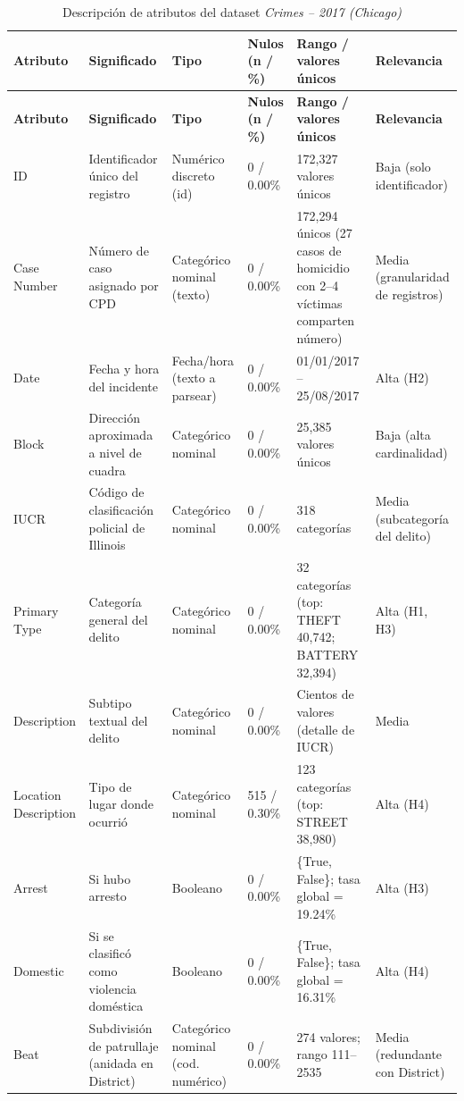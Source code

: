 \documentclass[11pt,a4paper]{article}
\begin{document}
\begin{landscape}
\begin{longtable}{P{2.6cm} P{4.0cm} P{1.6cm} P{2.0cm} P{4.4cm} P{3.4cm}}
\caption{Descripción de atributos del dataset \textit{Crimes -- 2017 (Chicago)}}
\label{tab:atributos}\\
\toprule
\textbf{Atributo} & \textbf{Significado} & \textbf{Tipo} & \textbf{Nulos (n / \%)} & \textbf{Rango / valores únicos} & \textbf{Relevancia}\\
\midrule
\endfirsthead
\toprule
\textbf{Atributo} & \textbf{Significado} & \textbf{Tipo} & \textbf{Nulos (n / \%)} & \textbf{Rango / valores únicos} & \textbf{Relevancia}\\
\midrule
\endhead
\bottomrule
\endfoot
ID & Identificador único del registro & Numérico discreto (id) & 0 / 0.00\% & 172,327 valores únicos & Baja (solo identificador) \\
Case Number & Número de caso asignado por CPD & Categórico nominal (texto) & 0 / 0.00\% & 172,294 únicos (27 casos de homicidio con 2--4 víctimas comparten número) & Media (granularidad de registros) \\
Date & Fecha y hora del incidente & Fecha/hora (texto a parsear) & 0 / 0.00\% & 01/01/2017 -- 25/08/2017 & Alta (H2) \\
Block & Dirección aproximada a nivel de cuadra & Categórico nominal & 0 / 0.00\% & 25,385 valores únicos & Baja (alta cardinalidad) \\
IUCR & Código de clasificación policial de Illinois & Categórico nominal & 0 / 0.00\% & 318 categorías & Media (subcategoría del delito) \\
Primary Type & Categoría general del delito & Categórico nominal & 0 / 0.00\% & 32 categorías (top: THEFT 40,742; BATTERY 32,394) & Alta (H1, H3) \\
Description & Subtipo textual del delito & Categórico nominal & 0 / 0.00\% & Cientos de valores (detalle de IUCR) & Media \\
Location Description & Tipo de lugar donde ocurrió & Categórico nominal & 515 / 0.30\% & 123 categorías (top: STREET 38,980) & Alta (H4) \\
Arrest & Si hubo arresto & Booleano & 0 / 0.00\% & \{True, False\}; tasa global = 19.24\% & Alta (H3) \\
Domestic & Si se clasificó como violencia doméstica & Booleano & 0 / 0.00\% & \{True, False\}; tasa global = 16.31\% & Alta (H4) \\
Beat & Subdivisión de patrullaje (anidada en District) & Categórico nominal (cod. numérico) & 0 / 0.00\% & 274 valores; rango 111--2535 & Media (redundante con District) \\

\end{longtable}
\end{landscape}
\end{document}
